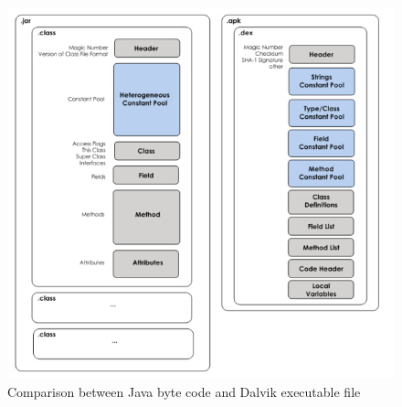  \begin{figure}[!htbp]
	\centering
	\includegraphics[width=1.0\textwidth]{clas-vs-dex.jpg}
		\caption{Comparison between Java byte code and Dalvik executable file\cite{android_vm}}
	\label{fig:class-vs-dex}
\end{figure}
